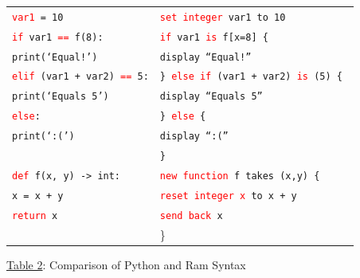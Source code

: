 \documentclass[11pt]{article}
\newcommand{\red}[1]{\textcolor{red}{#1}}
\begin{document}
\begin{center}
\begin{spacing}{1.1}
\begin{tabular}{|l|l|}
             
             \texttt{\red{var1} = 10} & \texttt{\red{set integer} var1 to 10} \\
             
             
             \texttt{\red{if} var1 \red{==} f(8):} & \texttt{\red{if} var1 \red{is} f[x=8] \{ } \\
             
             \quad \quad \texttt{print(`Equal!')} & \quad \quad \texttt{display ``Equal!''} \\
             
             \texttt{\red{elif} (var1 + var2) \red{==} 5:} & \texttt{\} \red{else if} (var1 + var2) \red{is} (5) \{ } \\
             
             \quad \quad \texttt{print(`Equals 5')} & \quad \quad \texttt{display ``Equals 5''} \\
             
             \texttt{\red{else}: } & \texttt{\} \red{else} \{} \\
             
             \quad \quad \texttt{print(`:(')} & \quad \quad \texttt{display ``:(''} \\
              
             \quad \quad & \texttt{\}} \\
             
             \hline 
             
             \texttt{\red{def} f(x, y) -> int:} & \texttt{\red{new function} f takes (x,y) \{ } \\
             \quad \quad \texttt{x = x + y} & \quad \quad \texttt{\red{reset integer x} to x + y} \\
             \quad \quad \texttt{\red{return} x} & \quad \quad \texttt{\red{send back} x} \\
              & \} \\
              
             \hline
        \end{tabular}
    
    \end{spacing}
    
    \bigskip
    
    \small{\hyperlink{tab2}{Table 2}: Comparison of Python and Ram Syntax}
    
\end{center}
\end{document}

